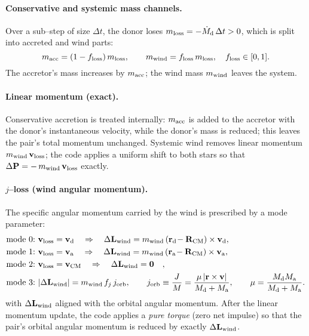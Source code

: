 \documentclass[11pt]{article}
\begin{document}
\paragraph{Conservative and systemic mass channels.}
Over a sub–step of size $\Delta t$, the donor loses $m_{\rm loss}=-\dot M_{\rm d}\,\Delta t>0$,
which is split into accreted and wind parts:
\[
m_{\rm acc} = (1-f_{\rm loss})\,m_{\rm loss},\qquad
m_{\rm wind} = f_{\rm loss}\,m_{\rm loss},\quad f_{\rm loss}\in[0,1].
\]
The accretor’s mass increases by $m_{\rm acc}$; the wind mass $m_{\rm wind}$
leaves the system.

\paragraph{Linear momentum (exact).}
Conservative accretion is treated internally: $m_{\rm acc}$ is added to the
accretor with the donor’s instantaneous velocity, while the donor’s mass is
reduced; this leaves the pair’s total momentum unchanged. Systemic wind
removes linear momentum $m_{\rm wind}\,\mathbf v_{\rm loss}$; the code applies a
uniform shift to both stars so that
$\Delta \mathbf P = -\,m_{\rm wind}\,\mathbf v_{\rm loss}$ exactly.

\paragraph{$j$–loss (wind angular momentum).}
The specific angular momentum carried by the wind is prescribed by a mode
parameter:
\begin{align*}
\text{mode 0:}~&\mathbf v_{\rm loss}=\mathbf v_{\rm d}\quad\Rightarrow\quad
\Delta\mathbf L_{\rm wind} = m_{\rm wind}\,(\mathbf r_{\rm d}\!-\mathbf R_{\rm CM}) \times \mathbf v_{\rm d},\\
\text{mode 1:}~&\mathbf v_{\rm loss}=\mathbf v_{\rm a}\quad\Rightarrow\quad
\Delta\mathbf L_{\rm wind} = m_{\rm wind}\,(\mathbf r_{\rm a}\!-\mathbf R_{\rm CM}) \times \mathbf v_{\rm a},\\
\text{mode 2:}~&\mathbf v_{\rm loss}=\mathbf v_{\rm CM}\quad\Rightarrow\quad
\Delta\mathbf L_{\rm wind}=\mathbf 0\quad,\\
\text{mode 3:}~&|\Delta\mathbf L_{\rm wind}|=m_{\rm wind}\,f_j\,j_{\rm orb},\qquad
j_{\rm orb}\equiv\frac{J}{M}=\frac{\mu\,|\mathbf r\times\mathbf v|}{M_{\rm d}+M_{\rm a}},
\qquad \mu=\frac{M_{\rm d}M_{\rm a}}{M_{\rm d}+M_{\rm a}}.
\end{align*}
with $\Delta\mathbf L_{\rm wind}$ aligned with the orbital angular momentum.
After the linear momentum update, the code applies a \emph{pure torque}
(zero net impulse) so that the pair’s orbital angular momentum is reduced by
exactly $\Delta\mathbf L_{\rm wind}$.
\end{document}
